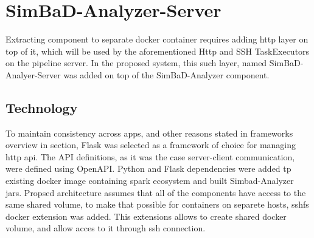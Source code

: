 \section{SimBaD-Analyzer-Server}
Extracting component to separate docker container requires adding http layer on top of it, which will be used by the aforementioned Http and SSH TaskExecutors on the pipeline server. In the proposed system, this such layer, named SimBaD-Analyer-Server was added on top of the SimBaD-Analyzer component. 
\subsection{Technology}
To maintain consistency across apps, and other reasons stated in frameworks overview in section, Flask was selected as a framework of choice for managing http api. The API definitions, as it was the case server-client communication, were defined using OpenAPI. Python and Flask dependencies were added tp existing docker image containing spark ecosystem and built Simbad-Analyzer jars. Propsed architecture assumes that all of the components have access to the same shared volume, to make that possible for containers on separete hosts, sshfs docker extension was added. This extensions allows to create shared docker volume, and allow acces to it through ssh connection.
